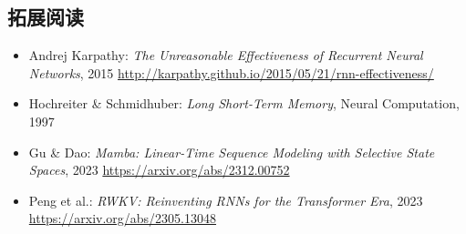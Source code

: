 
\subsection{拓展阅读}

\begin{itemize}
    \item Andrej Karpathy: \textit{The Unreasonable Effectiveness of Recurrent Neural Networks}, 2015 \url{http://karpathy.github.io/2015/05/21/rnn-effectiveness/}
    \item Hochreiter \& Schmidhuber: \textit{Long Short-Term Memory}, Neural Computation, 1997
    \item Gu \& Dao: \textit{Mamba: Linear-Time Sequence Modeling with Selective State Spaces}, 2023 \url{https://arxiv.org/abs/2312.00752}
    \item Peng et al.: \textit{RWKV: Reinventing RNNs for the Transformer Era}, 2023 \url{https://arxiv.org/abs/2305.13048}
\end{itemize}


